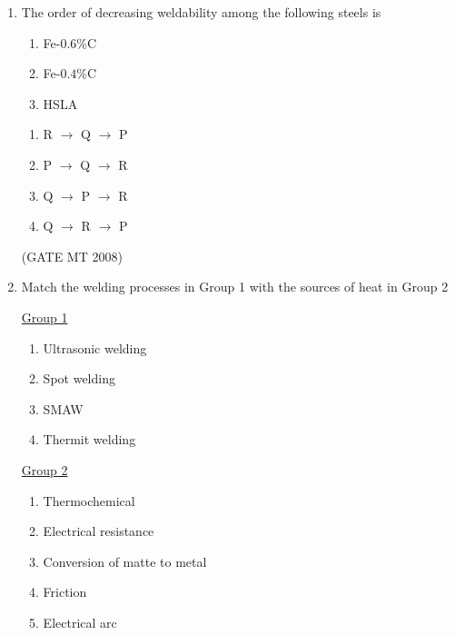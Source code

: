 \documentclass[journal, 11pt, onecolumn]{IEEEtran}
\theoremstyle{remark}
\begin{document}
\begin{enumerate}
\begin{multicols}{2}
\begin{enumerate} 
\item P, Q
\item Q, S
\item Q, T
\item P, S
\end{enumerate}
\end{multicols}
\hfill(GATE MT 2008)
\item The order of decreasing weldability among the following steels is
\begin{enumerate}[label=(\MakeUppercase{\alph*}), start= 16]
\item Fe-$0.6$\%C
\item Fe-$0.4$\%C
\item HSLA
\end{enumerate}

\begin{multicols}{2}
\begin{enumerate} 
\item R $\rightarrow$ Q $\rightarrow$ P
\item P $\rightarrow$ Q $\rightarrow$ R
\item Q $\rightarrow$ P $\rightarrow$ R
\item Q $\rightarrow$ R $\rightarrow$ P
\end{enumerate}
\end{multicols}
\hfill(GATE MT 2008)
\item Match the welding processes in Group 1 with the sources of heat in Group 2

\begin{multicols}{2}
\underline{Group 1}
\begin{enumerate}[label=(\Alph*), start=16]
\item Ultrasonic welding
\item Spot welding
\item SMAW
\item Thermit welding
\end{enumerate}

\underline{Group 2}
\begin{enumerate}[label=(\arabic*), start=1]
\item Thermochemical 
\item Electrical resistance
\item Conversion of matte to metal
\item Friction
\item Electrical arc
\end{enumerate}
\end{multicols}


\end{enumerate}
\end{document}
